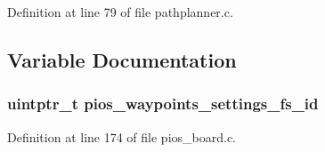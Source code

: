 \-Definition at line 79 of file pathplanner.\-c.



\subsection{\-Variable \-Documentation}
\hypertarget{group___path_planner_module_ga4b04979e5fb31eaa66088178605835cd}{
\subsubsection[{pios\-\_\-waypoints\-\_\-settings\-\_\-fs\-\_\-id}]{\setlength{\rightskip}{0pt plus 5cm}uintptr\-\_\-t {\bf pios\-\_\-waypoints\-\_\-settings\-\_\-fs\-\_\-id}}}\label{group___path_planner_module_ga4b04979e5fb31eaa66088178605835cd}


\-Definition at line 174 of file pios\-\_\-board.\-c.

